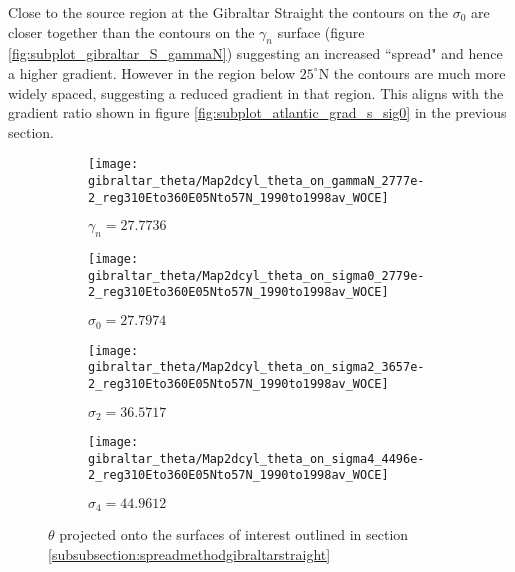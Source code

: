 Close to the source region at the Gibraltar Straight the contours on the $\sigma_0$ are closer together than the contours on the $\gamma_n$ surface (figure \ref{fig:subplot_gibraltar_S_gammaN}) suggesting an increased ``spread" and hence a higher gradient. However in the region below $25^{\circ}$N the contours are much more widely spaced, suggesting a reduced gradient in that region. This aligns with the gradient ratio shown in figure \ref{fig:subplot_atlantic_grad_s_sig0} in the previous section. 

\begin{figure}[htbp]
    \centering
    \begin{subfigure}[b]{0.4\textwidth}
         \centering
         \texttt{[image: gibraltar\_theta/Map2dcyl\_theta\_on\_gammaN\_2777e-2\_reg310Eto360E05Nto57N\_1990to1998av\_WOCE]}
         \caption{$\gamma_n = 27.7736$}
         \label{fig:subplot_gibraltar_theta_gammaN}
     \end{subfigure}
     \hfill
     \begin{subfigure}[b]{0.4\textwidth}
         \centering
         \texttt{[image: gibraltar\_theta/Map2dcyl\_theta\_on\_sigma0\_2779e-2\_reg310Eto360E05Nto57N\_1990to1998av\_WOCE]}
         \caption{$\sigma_0 = 27.7974$}
         \label{fig:subplot_gibraltar_theta_sig0}
     \end{subfigure}
     \begin{subfigure}[b]{0.4\textwidth}
         \centering
         \texttt{[image: gibraltar\_theta/Map2dcyl\_theta\_on\_sigma2\_3657e-2\_reg310Eto360E05Nto57N\_1990to1998av\_WOCE]}
         \caption{$\sigma_2 = 36.5717$}
         \label{fig:subplot_gibraltar_theta_sig2}
     \end{subfigure}
     \hfill
     \begin{subfigure}[b]{0.4\textwidth}
         \centering
         \texttt{[image: gibraltar\_theta/Map2dcyl\_theta\_on\_sigma4\_4496e-2\_reg310Eto360E05Nto57N\_1990to1998av\_WOCE]}
         \caption{$\sigma_4 = 44.9612$}
         \label{fig:subplot_gibraltar_theta_sig4}
     \end{subfigure}
    \caption{$\theta$ projected onto the surfaces of interest outlined in section \ref{subsubsection:spreadmethodgibraltarstraight}}
    \label{fig:gibraltar_theta}
    
\end{figure}

